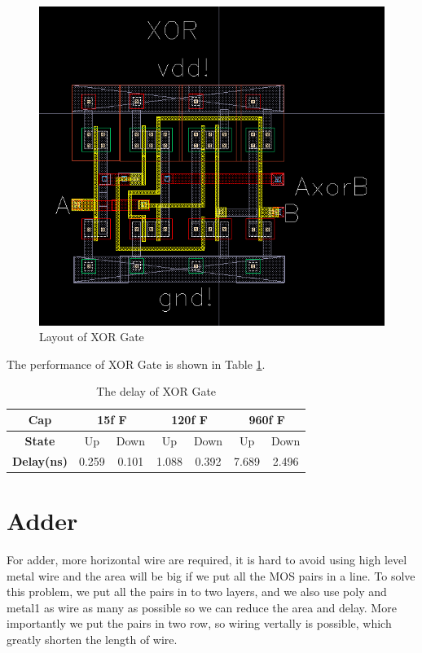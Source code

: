 \documentclass[conference]{IEEEtran}
\begin{document}
\begin{figure}[H]
    \centering
    \includegraphics[width = 0.6\linewidth]{xor2_layout.png}
    \caption{Layout of XOR Gate}
    \label{Layout of XOR Gate}
\end{figure}

The performance of XOR Gate is shown in Table \ref{The delay of XOR}.

\begin{table}[h]
    \caption{The delay of XOR Gate}
    \begin{center}
        \begin{tabular}{|c|c|c|c|c|c|c|}
            \hline
            \textbf{Cap} & \multicolumn{2}{|c|}{15f F} & \multicolumn{2}{|c|}{120f F} & \multicolumn{2}{|c|}{960f F} \\
            \hline
            \textbf{State} & Up & Down & Up & Down & Up & Down \\
            \hline
            \textbf{Delay(ns)} & 0.259 & 0.101 & 1.088 & 0.392 & 7.689 & 2.496 \\
            \hline
        \end{tabular}
    \end{center}
    \label{The delay of XOR}
\end{table}

\section{Adder}

For adder, more horizontal wire are required, it is hard to avoid using high level metal wire and the area will be big if we put all the MOS pairs in a line. To solve this problem, we put all the pairs in to two layers, and we also use poly and metal1 as wire as many as possible so we can reduce the area and delay. More importantly we put the pairs in two row, so wiring vertally is possible, which greatly shorten the length of wire. 
\end{document}
